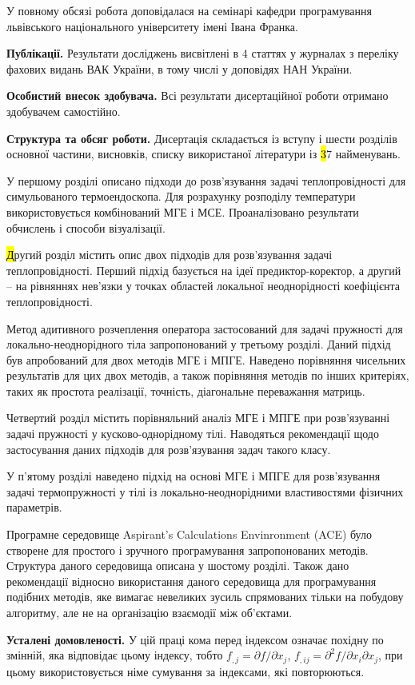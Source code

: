 У повному обсязі робота доповідалася на семінарі кафедри програмування львівського національного університету імені
Івана Франка.

\textbf{Публікації.} Результати досліджень висвітлені в 4 статтях у журналах з переліку фахових видань ВАК України, в
тому числі у доповідях НАН України.

\textbf{Особистий внесок здобувача.} Всі результати дисертаційної роботи отримано здобувачем самостійно.

\textbf{Структура та обсяг роботи.} Дисертація складається із вступу і шести розділів основної частини, висновків,
списку використаної літератури із {\hl 37} найменувань.

У першому розділі описано підходи до розв'язування задачі теплопровідності для симульованого термоендоскопа. Для 
розрахунку розподілу температури використовується комбінований МГЕ і МСЕ. Проаналізовано результати обчислень і способи
візуалізації.

{\hl Другий розділ містить опис двох підходів для розв'язування задачі теплопровідності. Перший підхід базується на ідеї
предиктор-коректор, а другий -- на рівняннях нев'язки у точках областей локальної неоднорідності коефіцієнта
теплопровідності.

Метод адитивного розчеплення оператора застосований для задачі пружності для локально-неоднорідного тіла запропонований
у третьому розділі. Даний підхід був апробований для двох методів МГЕ і МПГЕ. Наведено порівняння чисельних результатів
для цих двох методів, а також порівняння методів по інших критеріях, таких як простота реалізації, точність, діагональне
переважання матриць.

Четвертий розділ містить порівняльний аналіз МГЕ і МПГЕ при розв'язуванні задачі пружності у кусково-однорідному тілі.
Наводяться рекомендації щодо застосування даних підходів для розв'язування задач такого класу.

У п'ятому розділі наведено підхід на основі МГЕ і МПГЕ для розв'язування задачі термопружності у тілі із
локально-неоднорідними властивостями фізичних параметрів.}

Програмне середовище Aspirant's Calculations Envinronment (ACE) було створене для простого і зручного програмування
запропонованих методів. Структура даного середовища описана у шостому розділі. Також дано рекомендації відносно
використання даного середовища для програмування подібних методів, яке вимагає невеликих зусиль спрямованих тільки на
побудову алгоритму, але не на організацію взаємодії між об'єктами.

\textbf{Усталені домовленості.} У цій праці кома перед індексом означає похідну по змінній, яка відповідає цьому
індексу, тобто ${f_{,j} = \partial}{f/\partial}x_{j}$, ${{f_{,ij} = \partial^{2}}{f/\partial}x_{i}\partial x_{j}}{}$,
при цьому викори­стовується німе сумування за індек­сами, які повторюються.
